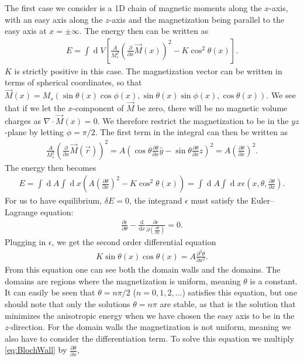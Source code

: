 \documentclass[12pt, a4paper, twoside, openright]{article}		%
\renewcommand{\d}[1]{\ensuremath{\operatorname{d}\!{#1}}}
\numberwithin{equation}{section}
\begin{document}
The first case we consider is a 1D chain of magnetic moments along the $x$-axis, with an easy axis along the $z$-axis and the magnetization being parallel to the easy axis at $x = \pm \infty$. The energy then can be written as
\begin{align}
\label{eq:BlochEnergy}
E = \int \d V \left[\frac{A}{M_s^2}\left(\frac{\partial}{\partial x}\vec{M}(x)\right)^2 - K \cos ^2 \theta (x)\right].
\end{align}
$K$ is strictly positive in this case. The magnetization vector can be written in terms of spherical coordinates, so that $\vec{M}(x) = M_s (\sin \theta (x) \cos \phi (x), \sin \theta (x) \sin \phi (x), \cos \theta (x))$. We see that if we let the $x$-component of $\vec{M}$ be zero, there will be no magnetic volume charges as $\nabla \cdot \vec{M}(x) = 0$. We therefore restrict the magnetization to be in the $yz$-plane by letting $\phi = \pi/2$. The first term in the integral can then be written as
\begin{align}
\frac{A}{M_s^2}\left(\frac{\partial}{\partial x}\vec{M}(\vec{r})\right)^2 = A\left(\cos\theta \frac{\partial \theta}{\partial x} \hat{y} - \sin\theta \frac{\partial \theta}{\partial x} \hat{z}\right)^2 = A \left(\frac{\partial \theta}{\partial x}\right)^2.
\end{align}
The energy then becomes
\begin{align}
E = \int \d A \int \d x \left(A \left(\frac{\partial \theta}{\partial x}\right)^2- K \cos ^2 \theta (x)\right) = \int \d A \int \d x \epsilon(x, \theta, \frac{\partial \theta}{\partial x}).
\end{align}
For us to have equilibrium, $\delta E = 0$, the integrand $\epsilon$ must satisfy the Euler--Lagrange equation:
\begin{align}
\frac{\partial \epsilon}{\partial \theta} - \frac{\textrm{d}}{\textrm{d} x} \frac{\partial \epsilon}{\partial (\frac{\partial \theta}{\partial x})} = 0.
\end{align}
Plugging in $\epsilon$, we get the second order differential equation
\begin{align}
\label{eq:BlochWall}
K\sin \theta (x) \cos \theta (x) = A \frac{\partial^2 \theta}{\partial x^2}.
\end{align} 
From this equation one can see both the domain walls and the domains. The domains are regions where the magnetization is uniform, meaning $\theta$ is a constant. It can easily be seen that $\theta = n\pi/2$ ($n = 0, 1, 2, \ldots$) satisfies this equation, but one should note that only the solutions $\theta = n\pi$ are stable, as that is the solution that minimizes the anisotropic energy when we have chosen the easy axis to be in the $z$-direction. For the domain walls the magnetization is not uniform, meaning we also have to consider the differentiation term. To solve this equation we multiply \eqref{eq:BlochWall} by $\frac{\partial \theta}{\partial x}$,
\end{document}

